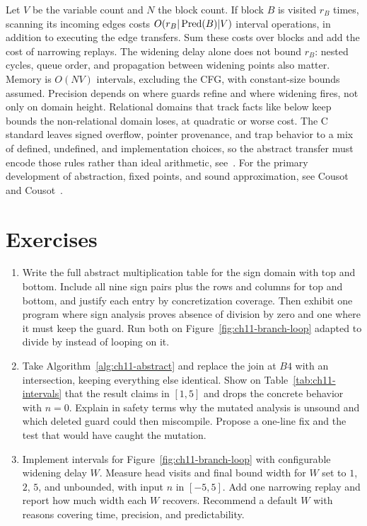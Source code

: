 Let $V$ be the variable count and $N$ the block count.
If block $B$ is visited $r_B$ times, scanning its incoming edges costs $O(r_B|\operatorname{Pred}(B)|V)$ interval operations, in addition to executing the edge transfers.
Sum these costs over blocks and add the cost of narrowing replays.
The widening delay alone does not bound $r_B$: nested cycles, queue order, and propagation between widening points also matter.
Memory is $O(NV)$ intervals, excluding the CFG, with constant-size bounds assumed.
Precision depends on where guards refine and where widening fires, not only on domain height.
Relational domains that track facts like  below  keep bounds the non-relational domain loses, at quadratic or worse cost.
The C standard leaves signed overflow, pointer provenance, and trap behavior to a mix of defined, undefined, and implementation choices, so the abstract transfer must encode those rules rather than ideal arithmetic, see~\cite{wg14-2011-c11}.
For the primary development of abstraction, fixed points, and sound approximation, see Cousot and Cousot~\cite{cousot-1977-abstract}.

\section{Exercises}
\label{sec:ch11-exercises}

\begin{enumerate}
\item \label{ex:ch11-sign-table} Write the full abstract multiplication table for the sign domain with top and bottom.
Include all nine sign pairs plus the rows and columns for top and bottom, and justify each entry by concretization coverage.
Then exhibit one program where sign analysis proves absence of division by zero and one where it must keep the guard.
Run both on Figure~\ref{fig:ch11-branch-loop} adapted to divide by  instead of looping on it.
\item \label{ex:ch11-unsound-twin} Take Algorithm~\ref{alg:ch11-abstract} and replace the join at $B4$ with an intersection, keeping everything else identical.
Show on Table~\ref{tab:ch11-intervals} that the result claims  in $[1, 5]$ and drops the concrete behavior with $n = 0$.
Explain in safety terms why the mutated analysis is unsound and which deleted guard could then miscompile.
Propose a one-line fix and the test that would have caught the mutation.
\item \label{ex:ch11-widen-budget} Implement intervals for Figure~\ref{fig:ch11-branch-loop} with configurable widening delay $W$.
Measure head visits and final bound width for $W$ set to $1$, $2$, $5$, and unbounded, with input $n$ in $[-5, 5]$.
Add one narrowing replay and report how much width each $W$ recovers.
Recommend a default $W$ with reasons covering time, precision, and predictability.
\end{enumerate}

